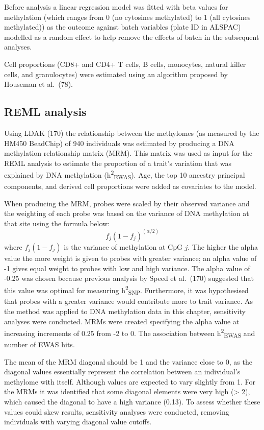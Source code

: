 \documentclass[11pt,oneside]{bristolthesis}
\begin{document}
Before analysis a linear regression model was fitted with beta values for methylation (which ranges from 0 (no cytosines methylated) to 1 (all cytosines methylated)) as the outcome against batch variables (plate ID in ALSPAC) modelled as a random effect to help remove the effects of batch in the subsequent analyses.

Cell proportions (CD8+ and CD4+ T cells, B cells, monocytes, natural killer cells, and granulocytes) were estimated using an algorithm proposed by Houseman et al.~(78).

\hypertarget{reml-analysis}{%
\subsection{REML analysis}\label{reml-analysis}}

Using LDAK (170) the relationship between the methylomes (as measured by the HM450 BeadChip) of 940 individuals was estimated by producing a DNA methylation relationship matrix (MRM). This matrix was used as input for the REML analysis to estimate the proportion of a trait's variation that was explained by DNA methylation (h\textsuperscript{2}\textsubscript{EWAS}). Age, the top 10 ancestry principal components, and derived cell proportions were added as covariates to the model.

When producing the MRM, probes were scaled by their observed variance and the weighting of each probe was based on the variance of DNA methylation at that site using the formula below:
\begin{equation}
    f_{j}(1-f_{j})^{(\alpha/2)}
    \label{eq:mrm-weights}
\end{equation}
where \(f_j(1-f_j)\) is the variance of methylation at CpG \(j\). The higher the alpha value the more weight is given to probes with greater variance; an alpha value of -1 gives equal weight to probes with low and high variance. The alpha value of -0.25 was chosen because previous analysis by Speed et al.~(170) suggested that this value was optimal for measuring h\textsuperscript{2}\textsubscript{SNP}. Furthermore, it was hypothesised that probes with a greater variance would contribute more to trait variance. As the method was applied to DNA methylation data in this chapter, sensitivity analyses were conducted. MRMs were created specifying the alpha value at increasing increments of 0.25 from -2 to 0. The association between h\textsuperscript{2}\textsubscript{EWAS} and number of EWAS hits.

The mean of the MRM diagonal should be 1 and the variance close to 0, as the diagonal values essentially represent the correlation between an individual's methylome with itself. Although values are expected to vary slightly from 1. For the MRMs it was identified that some diagonal elements were very high (\textgreater{} 2), which caused the diagonal to have a high variance (0.13). To assess whether these values could skew results, sensitivity analyses were conducted, removing individuals with varying diagonal value cutoffs.
\end{document}
